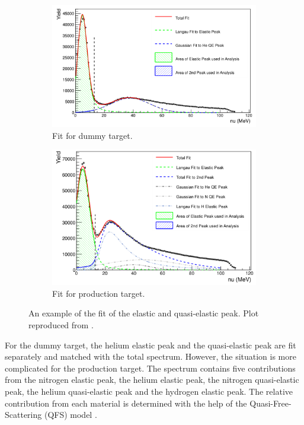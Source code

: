 \begin{figure}[tb!]
  \centering
  \begin{subfigure}[t]{0.52\textwidth}
    \includegraphics[width=\textwidth]{figs/packing-fraction-dummy.png}
    \caption{Fit for dummy target.}
  \end{subfigure}
  \begin{subfigure}[t]{0.46\textwidth}
    \includegraphics[width=\textwidth]{figs/packing-fraction-production.png}
    \caption{Fit for production target.}
  \end{subfigure}
  \caption[An example of the fit of the elastic and quasi-elastic peak.]{An example of the fit of the elastic and quasi-elastic peak. Plot reproduced from \cite{Cummings2015}. \label{C7S3F1}}
\end{figure}

For the dummy target, the helium elastic peak and the quasi-elastic peak are fit separately and matched with the total spectrum. However, the situation is more complicated for the production target. The spectrum contains five contributions from the nitrogen elastic peak, the helium elastic peak, the nitrogen quasi-elastic peak, the helium quasi-elastic peak and the hydrogen elastic peak. The relative contribution from each material is determined with the help of the Quasi-Free-Scattering (QFS) model \cite{Lightbody1988}.

